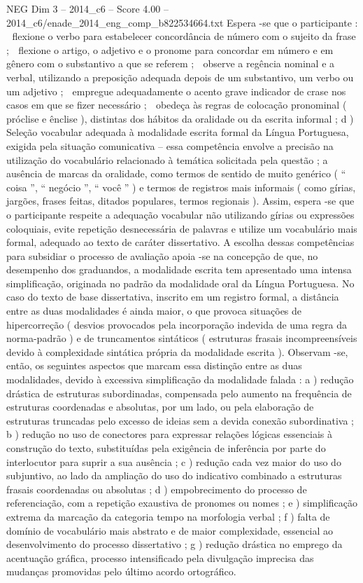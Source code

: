 \begin{textsample}{NEG Dim 3 – 2014\_c6 – Score 4.00 – 2014\_c6/enade\_2014\_eng\_comp\_b822534664.txt}
Espera -se que o participante :  flexione o verbo para estabelecer concordância de número com o sujeito da frase ;  flexione o artigo, o adjetivo e o pronome para concordar em número e em gênero com o substantivo a que se referem ;  observe a regência nominal e a verbal, utilizando a preposição adequada depois de um substantivo, um verbo ou um adjetivo ;  empregue adequadamente o acento grave indicador de crase nos casos em que se fizer necessário ;  obedeça às regras de colocação pronominal ( próclise e ênclise ), distintas dos hábitos da oralidade ou da escrita informal ; d ) Seleção vocabular adequada à modalidade escrita formal da Língua Portuguesa, exigida pela situação comunicativa – essa competência envolve a precisão na utilização do vocabulário relacionado à temática solicitada pela questão ; a ausência de marcas da oralidade, como termos de sentido de muito genérico ( “ coisa ”, “ negócio ”, “ você ” ) e termos de registros mais informais ( como gírias, jargões, frases feitas, ditados populares, termos regionais ).
Assim, espera -se que o participante respeite a adequação vocabular não utilizando gírias ou expressões coloquiais, evite repetição desnecessária de palavras e utilize um vocabulário mais formal, adequado ao texto de caráter dissertativo.
A escolha dessas competências para subsidiar o processo de avaliação apoia -se na concepção de que, no desempenho dos graduandos, a modalidade escrita tem apresentado uma intensa simplificação, originada no padrão da modalidade oral da Língua Portuguesa.
No caso do texto de base dissertativa, inscrito em um registro formal, a distância entre as duas modalidades é ainda maior, o que provoca situações de hipercorreção ( desvios provocados pela incorporação indevida de uma regra da norma-padrão ) e de truncamentos sintáticos ( estruturas frasais incompreensíveis devido à complexidade sintática própria da modalidade escrita ).
Observam -se, então, os seguintes aspectos que marcam essa distinção entre as duas modalidades, devido à excessiva simplificação da modalidade falada : a ) redução drástica de estruturas subordinadas, compensada pelo aumento na frequência de estruturas coordenadas e absolutas, por um lado, ou pela elaboração de estruturas truncadas pelo excesso de ideias sem a devida conexão subordinativa ; b ) redução no uso de conectores para expressar relações lógicas essenciais à construção do texto, substituídas pela exigência de inferência por parte do interlocutor para suprir a sua ausência ; c ) redução cada vez maior do uso do subjuntivo, ao lado da ampliação do uso do indicativo combinado a estruturas frasais coordenadas ou absolutas ; d ) empobrecimento do processo de referenciação, com a repetição exaustiva de pronomes ou nomes ; e ) simplificação extrema da marcação da categoria tempo na morfologia verbal ; f ) falta de domínio de vocabulário mais abstrato e de maior complexidade, essencial ao desenvolvimento do processo dissertativo ; g ) redução drástica no emprego da acentuação gráfica, processo intensificado pela divulgação imprecisa das mudanças promovidas pelo último acordo ortográfico.

\end{textsample}
